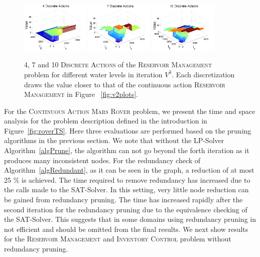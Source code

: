 \documentclass[twoside,11pt]{article}
\newcommand{\MarsRover}{\textsc{Mars Rover }}
\newcommand{\InventoryControl}{\textsc{Inventory Control }}
\newcommand{\WaterReservoir}{\textsc{Reservoir Management }}
\begin{document}
\begin{figure}[tbp!]
\vspace{-2mm}
\centering
\includegraphics[width=0.29\textwidth]{Figures2/camdp/rover3d4.pdf}
\includegraphics[width=0.29\textwidth]{Figures2/camdp/rover3d7.pdf}
\includegraphics[width=0.29\textwidth]{Figures2/camdp/rover3d10.pdf}
\vspace{-3mm}
\caption{%
4, 7 and 10 \textsc{Discrete Actions} of the \WaterReservoir problem for different water levels in iteration $V^3$. Each discretization draws the value closer to that of the continuous action \WaterReservoir in Figure ~\ref{fig:v2plots}.  
}
\label{fig:discreteplots}
\vspace{-4mm}
\end{figure}
For the \textsc{Continuous Action} \MarsRover problem, we present the time and space analysis for the problem description defined in the introduction in Figure~\ref{fig:roverTS}. Here three evaluations are performed based on the pruning algorithms in the previous section. We note that without the LP-Solver Algorithm~\ref{algPrune}, the algorithm can not go beyond the forth iteration as it produces many inconsistent nodes. For the redundancy check of Algorithm~\ref{algRedundant}, as it can be seen in the graph, a reduction of at most 25 \% is achieved. The time required to remove redundancy has increased due to the calls made to the SAT-Solver.  In this setting, very little node reduction can be gained from redundancy pruning. The time has increased rapidly after the second iteration for the redundancy pruning due to the equivalence checking of the SAT-Solver. This suggests that in some domains using redundancy pruning in not efficient and should be omitted from the final results. We next show results for the  \WaterReservoir and \InventoryControl problem without redundancy pruning. 
\end{document}
